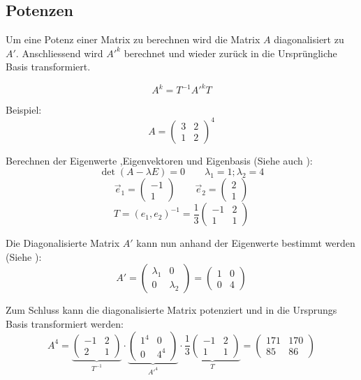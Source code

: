 \subsection{Potenzen}\label{potenz}
Um eine Potenz einer Matrix zu berechnen wird die Matrix $A$ diagonalisiert zu $A'$. Anschliessend wird $A'^k$ berechnet und wieder zurück in die Ursprüngliche Basis transformiert.

\[ A^k = T^{-1}A'^kT \]

\noindent Beispiel:
\[ 
A = \begin{pmatrix}
	3 & 2 \\ 1 & 2
\end{pmatrix}^4
\]

\noindent Berechnen der Eigenwerte ,Eigenvektoren und Eigenbasis (Siehe auch ): 
\[\det(A - \lambda E) = 0 \qquad {\scriptstyle \lambda_1 = 1; \lambda_2 = 4}\]
\[\vec{e}_1 = \begin{pmatrix} -1 \\ 1 \end{pmatrix} \qquad \vec{e}_2 = \begin{pmatrix} 2 \\ 1 \end{pmatrix}\]
\[ T = (e_1, e_2)^{-1} = \frac{1}{3}\begin{pmatrix}	-1 & 2 \\ 1 & 1 \end{pmatrix} \]

\noindent Die Diagonalisierte Matrix $A'$ kann nun anhand der Eigenwerte bestimmt werden (Siehe ):
\[
	A' = 
	\begin{pmatrix}
		\lambda_1 & 0 \\ 0 & \lambda_2 
	\end{pmatrix} 
	=
	\begin{pmatrix}
		1 & 0 \\ 0 & 4
	\end{pmatrix}
\]


\noindent Zum Schluss kann die diagonalisierte Matrix potenziert und in die Ursprungs Basis transformiert werden:
\[
A^4 = \underbrace{\begin{pmatrix}	-1 & 2 \\ 2 & 1 \end{pmatrix}}_{T^{-1}} \cdot \underbrace{\begin{pmatrix}	1^4 & 0 \\ 0 & 4^4 \end{pmatrix}}_{A'^4} \cdot \underbrace{\frac{1}{3}\begin{pmatrix}	-1 & 2 \\ 1 & 1 \end{pmatrix}}_{T} = \begin{pmatrix}	171 & 170 \\ 85 & 86 \end{pmatrix}
\]

